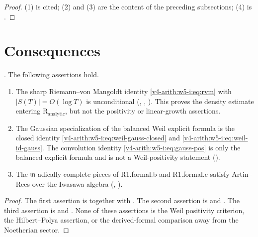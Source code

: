 \begin{proof}
(1) is cited; (2) and (3) are the content of the preceding
subsections; (4) is
.
\end{proof}

\section{Consequences}
\label{v4-arith:w5-i:summary}

\begin{proposition}
\label{v4-arith:w5-i:prop:three-exact-inputs}
\ClaimStatusProvedHere.
The following assertions hold.

\begin{enumerate}
\item The sharp Riemann--von Mangoldt identity
\eqref{v4-arith:w5-i:eq:rvm} with \(|S(T)|=O(\log T)\) is
unconditional
(,
,
). This proves the density estimate
entering \(\mathrm{R}_{\mathrm{analytic}}\), but not the positivity or
linear-growth assertions.
\item The Gaussian specialization of the balanced Weil explicit formula
is the closed identity \eqref{v4-arith:w5-i:eq:weil-gauss-closed} and
\eqref{v4-arith:w5-i:eq:weil-id-gauss}. The convolution
identity \eqref{v4-arith:w5-i:eq:gauss-pos} is only the balanced
explicit formula and is not a Weil-positivity statement
().
\item The \(\mathfrak{m}\)-adically-complete pieces of
R1.formal.b and R1.formal.c satisfy Artin--Rees over the Iwasawa algebra
(,
).
\end{enumerate}
\end{proposition}

\begin{proof}
The first assertion is  together with
. The second assertion is
 and
. The third assertion is
 and
. None of these assertions is the
Weil positivity criterion, the Hilbert--Polya assertion, or the
derived-formal comparison away from the Noetherian sector.
\end{proof}


